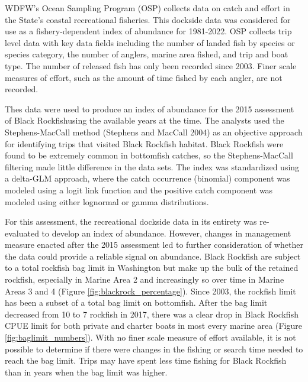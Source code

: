 \documentclass[11pt,
  english,
  letterpaper,
]{article}
\begin{document}
WDFW's Ocean Sampling Program (OSP) collects data on catch and effort in the State's coastal recreational fisheries. This dockside data was considered for use as a fishery-dependent index of abundance for 1981-2022. OSP collects trip level data with key data fields including the number of landed fish by species or species category, the number of anglers, marine area fished, and trip and boat type. The number of released fish has only been recorded since 2003. Finer scale measures of effort, such as the amount of time fished by each angler, are not recorded.

Thes data were used to produce an index of abundance for the 2015 assessment of Black Rockfishusing the available years at the time. The analysts used the Stephens-MacCall method (Stephens and MacCall 2004) as an objective approach for identifying trips that visited Black Rockfish habitat. Black Rockfish were found to be extremely common in bottomfish catches, so the Stephens-MacCall filtering made little difference in the data sets. The index was standardized using a delta-GLM approach, where the catch occurrence (binomial) component was modeled using a logit link function and the positive catch component was modeled using either lognormal or gamma distributions.

For this assessment, the recreational dockside data in its entirety was re-evaluated to develop an index of abundance. However, changes in management measure enacted after the 2015 assessment led to further consideration of whether the data could provide a reliable signal on abundance. Black Rockfish are subject to a total rockfish bag limit in Washington but make up the bulk of the retained rockfish, especially in Marine Area 2 and increasingly so over time in Marine Areas 3 and 4 (Figure \ref{fig:blackrock_percentage}). Since 2003, the rockfish limit has been a subset of a total bag limit on bottomfish. After the bag limit decreased from 10 to 7 rockfish in 2017, there was a clear drop in Black Rockfish CPUE limit for both private and charter boats in most every marine area (Figure \ref{fig:baglimit_numbers}). With no finer scale measure of effort available, it is not possible to determine if there were changes in the fishing or search time needed to reach the bag limit. Trips may have spent less time fishing for Black Rockfish than in years when the bag limit was higher.
\end{document}
